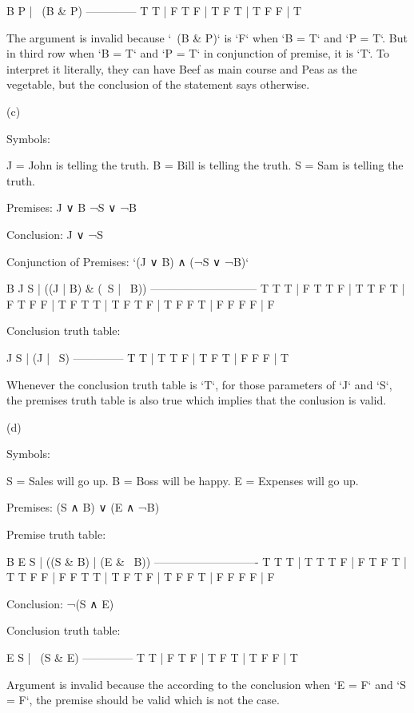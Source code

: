     B P | ~(B & P)
    --------------
    T T | F
    T F | T
    F T | T
    F F | T

The argument is invalid because `~(B & P)` is `F` when `B = T` and `P
= T`. But in third row when `B = T` and `P = T` in conjunction of
premise, it is `T`. To interpret it literally, they can have Beef as
main course and Peas as the vegetable, but the conclusion of the
statement says otherwise.

(c)

Symbols:

    J = John is telling the truth.
    B = Bill is telling the truth.
    S = Sam is telling the truth.

Premises:
    J ∨ B
    ¬S ∨ ¬B

Conclusion:
    J ∨ ¬S

Conjunction of Premises: `(J ∨ B) ∧ (¬S ∨ ¬B)`

    B J S | ((J | B) & (~S | ~B))
    -----------------------------
    T T T | F
    T T F | T
    T F T | F
    T F F | T
    F T T | T
    F T F | T
    F F T | F
    F F F | F

Conclusion truth table:

    J S | (J | ~S)
    --------------
    T T | T
    T F | T
    F T | F
    F F | T

Whenever the conclusion truth table is `T`, for those parameters of
`J` and `S`, the premises truth table is also true which implies that
the conlusion is valid.

(d)

Symbols:

    S = Sales will go up.
    B = Boss will be happy.
    E = Expenses will go up.

Premises:
    (S ∧ B) ∨ (E ∧ ¬B)

Premise truth table:

    B E S | ((S & B) | (E & ~B))
    ----------------------------
    T T T | T
    T T F | F
    T F T | T
    T F F | F
    F T T | T
    F T F | T
    F F T | F
    F F F | F

Conclusion:
    ¬(S ∧ E)

Conclusion truth table:

    E S | ~(S & E)
    --------------
    T T | F
    T F | T
    F T | T
    F F | T

Argument is invalid because the according to the conclusion when `E =
F` and `S = F`, the premise should be valid which is not the case.

